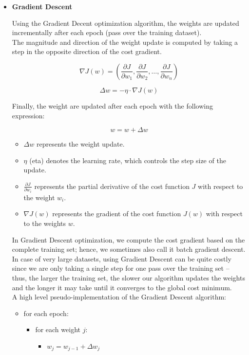 \begin{itemize}
  \item \textbf{Gradient Descent}

Using the Gradient Decent optimization algorithm, the weights are updated incrementally after each epoch (pass over the training dataset). \\

The magnitude and direction of the weight update is computed by taking a step in the opposite direction of the cost gradient.

\[\nabla J(w) = (\frac{\partial J}{\partial w_1}, \frac{\partial J}{\partial w_2}, \ldots, \frac{\partial J}{\partial w_n})\]

\[
\Delta w = -\eta \cdot \nabla J(w)
\]

Finally, the weight are updated after each epoch with the following expression:

\[
w = w + \Delta w
\]


\begin{itemize}
    \item \(\Delta w\) represents the weight update.
    \item \(\eta\) (eta) denotes the learning rate, which controls the step size of the update.
    \item  \(\frac{\partial J}{\partial w_i}\) represents the partial derivative of the cost function \(J\) with respect to the weight \(w_i\).
    \item \(\nabla J(w)\) represents the gradient of the cost function \(J(w)\) with respect to the weights \(w\).
\end{itemize}

In Gradient Descent optimization, we compute the cost gradient based on the complete training set; hence, we sometimes also call it batch gradient descent. In case of very large datasets, using Gradient Descent can be quite costly since we are only taking a single step for one pass over the training set – thus, the larger the training set, the slower our algorithm updates the weights and the longer it may take until it converges to the global cost minimum. \\

A high level pseudo-implementation of the Gradient Descent algorithm:

\begin{itemize}[label=\(\circ\)]
  \item for each epoch:
  \begin{itemize}[label=\(\circ\), topsep=0pt]
    \item for each weight \(j\):
    \begin{itemize}[label=\(\circ\), topsep=5pt]
      \item \(w_j = w_{j-1} + \Delta w_j\)
    \end{itemize}
  \end{itemize}
\end{itemize}


\end{itemize}
